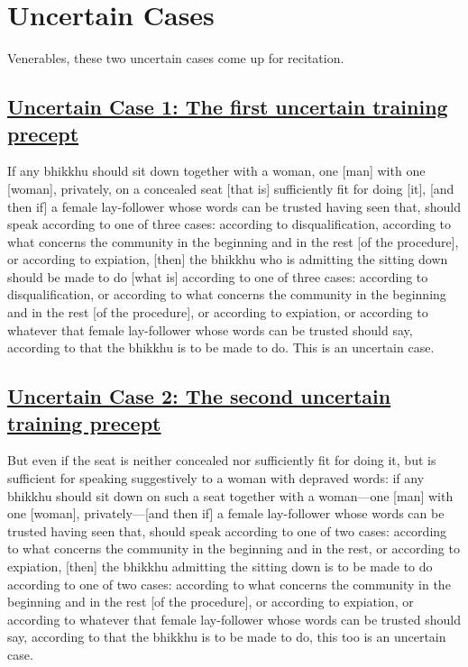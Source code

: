 
\section{Uncertain Cases}
\label{unc}

\begin{intro}
	Venerables, these two uncertain cases come up for recitation.
\end{intro}

\subsection*{\hyperref[aniy1]{Uncertain Case 1: The first uncertain training precept}}
\label{unc1}

If any bhikkhu should sit down together with a woman, one [man] with one [woman], privately, on a concealed seat [that is] sufficiently fit for doing [it], [and then if] a female lay-follower whose words can be trusted having seen that, should speak according to one of three cases: according to disqualification, according to what concerns the community in the beginning and in the rest [of the procedure], or according to expiation, [then] the bhikkhu who is admitting the sitting down should be made to do [what is] according to one of three cases: according to disqualification, or according to what concerns the community in the beginning and in the rest [of the procedure], or according to expiation, or according to whatever that female lay-follower whose words can be trusted should say, according to that the bhikkhu is to be made to do. This is an uncertain case.



\subsection*{\hyperref[aniy2]{Uncertain Case 2: The second uncertain training precept}}
\label{unc2}
But even if the seat is neither concealed nor sufficiently fit for doing it, but is sufficient for speaking suggestively to a woman with depraved words: if any bhikkhu should sit down on such a seat together with a woman—one [man] with one [woman], privately—[and then if] a female lay-follower whose words can be trusted having seen that, should speak according to one of two cases: according to what concerns the community in the beginning and in the rest, or according to expiation, [then] the bhikkhu admitting the sitting down is to be made to do according to one of two cases: according to what concerns the community in the beginning and in the rest [of the procedure], or according to expiation, or according to whatever that female lay-follower whose words can be trusted should say, according to that the bhikkhu is to be made to do, this too is an uncertain case.



